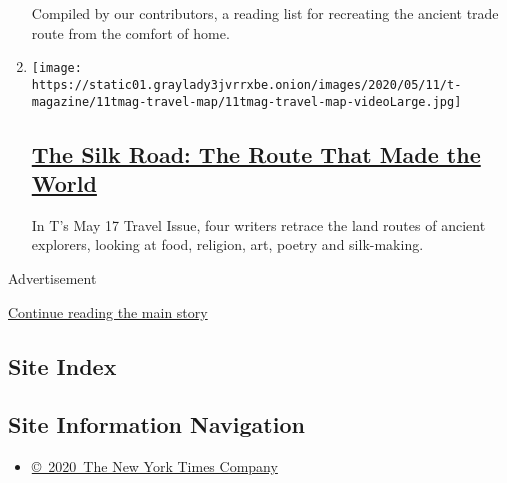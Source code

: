 \begin{enumerate}
  Compiled by our contributors, a reading list for recreating the
  ancient trade route from the comfort of home.
\item
  \texttt{[image: https://static01.graylady3jvrrxbe.onion/images/2020/05/11/t-magazine/11tmag-travel-map/11tmag-travel-map-videoLarge.jpg]}

  \hypertarget{the-silk-road-the-route-that-made-the-world}{%
  \subsection{\texorpdfstring{\href{/2020/05/11/t-magazine/the-silk-road.html}{The
  Silk Road: The Route That Made the
  World}}{The Silk Road: The Route That Made the World}}\label{the-silk-road-the-route-that-made-the-world}}

  In T's May 17 Travel Issue, four writers retrace the land routes of
  ancient explorers, looking at food, religion, art, poetry and
  silk-making.
\end{enumerate}

Advertisement

\protect\hyperlink{after-mid1}{Continue reading the main story}

\hypertarget{site-index}{%
\subsection{Site Index}\label{site-index}}

\hypertarget{site-information-navigation}{%
\subsection{Site Information
Navigation}\label{site-information-navigation}}

\begin{itemize}
\tightlist
\item
  \href{https://help.nytimes3xbfgragh.onion/hc/en-us/articles/115014792127-Copyright-notice}{©~2020~The
  New York Times Company}
\end{itemize}

